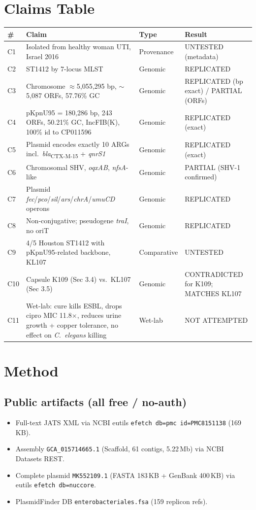 \documentclass[11pt]{article}
\begin{document}
\section{Claims Table}
\begin{longtable}{p{0.6cm}p{7.5cm}p{2cm}p{4cm}}
\toprule
\# & Claim & Type & Result \\
\midrule
C1  & Isolated from healthy woman UTI, Israel 2016 & Provenance & UNTESTED (metadata) \\
C2  & ST1412 by 7-locus MLST & Genomic & REPLICATED \\
C3  & Chromosome $\approx$5{,}055{,}295 bp, $\sim$5{,}087 ORFs, 57.76\% GC & Genomic & REPLICATED (bp exact) / PARTIAL (ORFs) \\
C4  & pKpnU95 = 180{,}286 bp, 243 ORFs, 50.21\% GC, IncFIB(K), 100\% id to CP011596 & Genomic & REPLICATED (exact) \\
C5  & Plasmid encodes exactly 10 ARGs incl.\ \textit{bla}\textsubscript{CTX-M-15} + \textit{qnrS1} & Genomic & REPLICATED (exact) \\
C6  & Chromosomal SHV, \textit{oqxAB}, \textit{nfsA}-like & Genomic & PARTIAL (SHV-1 confirmed) \\
C7  & Plasmid \textit{fec}/\textit{pco}/\textit{sil}/\textit{ars}/\textit{chrA}/\textit{umuCD} operons & Genomic & REPLICATED \\
C8  & Non-conjugative; pseudogene \textit{traI}, no oriT & Genomic & REPLICATED \\
C9  & 4/5 Houston ST1412 with pKpnU95-related backbone, KL107 & Comparative & UNTESTED \\
C10 & Capsule K109 (Sec 3.4) vs.\ KL107 (Sec 3.5) & Genomic & CONTRADICTED for K109; MATCHES KL107 \\
C11 & Wet-lab: cure kills ESBL, drops cipro MIC 11.8$\times$, reduces urine growth + copper tolerance, no effect on \textit{C.\ elegans} killing & Wet-lab & NOT ATTEMPTED \\
\bottomrule
\end{longtable}

\section{Method}
\subsection{Public artifacts (all free / no-auth)}
\begin{itemize}
  \item Full-text JATS XML via NCBI eutils \texttt{efetch db=pmc id=PMC8151138} (169\,KB).
  \item Assembly \texttt{GCA\_015714665.1} (Scaffold, 61 contigs, 5.22\,Mb) via NCBI Datasets REST.
  \item Complete plasmid \texttt{MK552109.1} (FASTA 183\,KB + GenBank 400\,KB) via eutils \texttt{efetch db=nuccore}.
  \item PlasmidFinder DB \texttt{enterobacteriales.fsa} (159 replicon refs).
\end{itemize}
\end{document}

